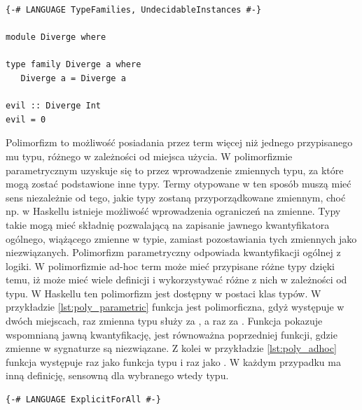 {\begin{lstlisting}[float,label={lst:types_diverge},
                   caption={Przykład programu, dla którego statyczne sprawdzanie typów w GHC się nie zakończy.}]
{-# LANGUAGE TypeFamilies, UndecidableInstances #-}

module Diverge where

type family Diverge a where
   Diverge a = Diverge a

evil :: Diverge Int
evil = 0
\end{lstlisting}


Polimorfizm to możliwość posiadania przez term więcej niż jednego przypisanego mu typu, różnego w zależności od miejsca użycia. W polimorfizmie parametrycznym uzyskuje się to przez wprowadzenie zmiennych typu, za które mogą zostać podstawione inne typy. Termy otypowane w ten sposób muszą mieć sens niezależnie od tego, jakie typy zostaną przyporządkowane zmiennym, choć np. w Haskellu istnieje możliwość wprowadzenia ograniczeń na zmienne. Typy takie mogą mieć składnię pozwalającą na zapisanie jawnego kwantyfikatora ogólnego, wiążącego zmienne w typie, zamiast pozostawiania tych zmiennych jako niezwiązanych. Polimorfizm parametryczny odpowiada kwantyfikacji ogólnej z logiki. W polimorfizmie ad-hoc term może mieć przypisane różne typy dzięki temu, iż może mieć wiele definicji i wykorzystywać różne z nich w zależności od typu. W Haskellu ten polimorfizm jest dostępny w postaci klas typów\cite{TAPL}. W przykładzie \ref{lst:poly_parametric} funkcja  jest polimorficzna, gdyż występuje w dwóch miejscach, raz zmienna typu  służy za , a raz za . Funkcja  pokazuje wspomnianą jawną kwantyfikację, jest równoważna poprzedniej funkcji, gdzie zmienne w sygnaturze są niezwiązane. Z kolei w przykładzie \ref{lst:poly_adhoc} funkcja  występuje raz jako funkcja typu  i raz jako . W każdym przypadku ma inną definicję, sensowną dla wybranego wtedy typu.

\begin{lstlisting}[float,label={lst:poly_parametric},
                   caption={Przykład użycia polimorfizmu parametrycznego w Haskellu.}]
{-# LANGUAGE ExplicitForAll #-}


\end{lstlisting}}
